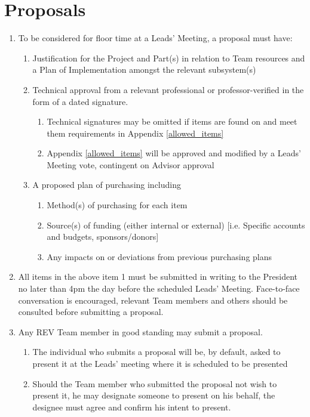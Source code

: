 \section{Proposals}
\label{proposals}
\begin{enumerate}
\item To be considered for floor time at a Leads’ Meeting, a proposal must have:
    \begin{enumerate}
    \item Justification for the Project and Part(s) in relation to Team resources and a Plan of
Implementation amongst the relevant subsystem(s)
    \item Technical approval from a relevant professional or professor-verified in the form of a
dated signature. 
        \begin{enumerate}
        \item Technical signatures may be omitted if items are found on and meet them requirements in Appendix \ref{allowed_items}
        \item Appendix \ref{allowed_items} will be approved and modified by a Leads’ Meeting vote, contingent on Advisor approval
        \end{enumerate}
    \item A proposed plan of purchasing including 
        \begin{enumerate}
        \item Method(s) of purchasing for each item
        \item  Source(s) of funding (either internal or external) [i.e. Specific accounts and budgets, sponsors/donors]
        \item Any impacts on or deviations from previous purchasing plans
        \end{enumerate}
    \end{enumerate}
\item All items in the above item 1 must be submitted in writing to the President no later than 4pm the day before the scheduled Leads’ Meeting. Face-to-face conversation is encouraged, relevant Team members and others should be consulted before submitting a proposal.
\item Any REV Team member in good standing may submit a proposal. 
    \begin{enumerate}
    \item The individual who submits a proposal will be, by default, asked to present it at the Leads’ meeting where it is scheduled to be presented
    \item Should the Team member who submitted the proposal not wish to present it, he may designate someone to present on his behalf, the designee must agree and confirm his intent to present. 

\end{enumerate}
\end{enumerate}
